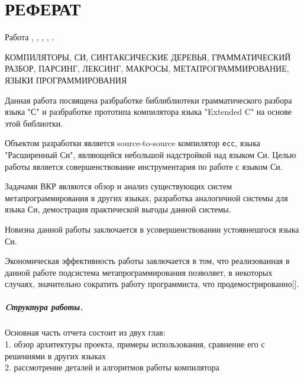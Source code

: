 \chapter*{РЕФЕРАТ}

Работа , 
    ,
    ,
    ,
    .

    КОМПИЛЯТОРЫ, СИ, СИНТАКСИЧЕСКИЕ ДЕРЕВЬЯ, ГРАММАТИЧЕСКИЙ РАЗБОР, ПАРСИНГ, ЛЕКСИНГ, МАКРОСЫ, МЕТАПРОГРАММИРОВАНИЕ, ЯЗЫКИ ПРОГРАММИРОВАНИЯ %

    \vspace{5mm}
Данная работа посвящена разбработке библиблиотеки грамматического разбора языка "С" и разбработке прототипа компилятора языка "Extended C" на основе этой библиотки.

Объектом разработки является source-to-source компилятор \verb|ecc|, языка "Расширенный Си", являющейся небольшой надстройкой над языком Си.
Целью работы является совершенствование инструментария по работе с языком Си.

Задачами ВКР являются обзор и анализ существующих систем метапрограммирования в других языках, 
разработка аналогичной системы для языка Си,
демострация практической выгоды данной системы.

Новизна данной работы заключается в усовершенствовании устоявнешгося языка Си.

Экономическая эффективность работы завлючается в том, что реализованная в данной работе подсистема метапрограммирования позволяет, в некоторых случаях, значительно сократить работу программиста, что продемострированно[]. %

\paragraph*{Cтруктура работы.} Основная часть отчета состоит из двух глав:\\
1. обзор архитектуры проекта, примеры использования, сравнение его с решениями в других языках\\
2. рассмотрение деталей и алгоритмов работы компилятора


